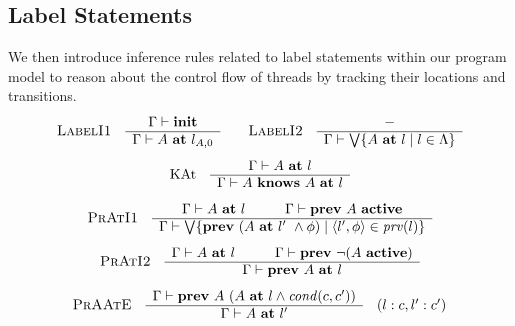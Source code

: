 \subsection{Label Statements}
We then introduce inference rules related to label statements within our program model to reason about the control flow of threads by tracking their locations and transitions. 
%
\[
\begin{array}{ccc}
\begin{array}{cc}
\mbox{\sc LabelI1}
&
\begin{array}{c}
\Gamma \vdash \mathbf{init} \\ \hline
\Gamma \vdash A\ \mathbf{at}\ l_{A,0}
\end{array}
\end{array}
&
\begin{array}{cc}
\mbox{\sc LabelI2}
&
\begin{array}{c}
- \\ \hline
\Gamma \vdash \bigvee\{A\ \mathbf{at}\ l\mid l\in\Lambda\}
\end{array}
\end{array}
\end{array}
\]
%
\[
\begin{array}{cc}
\mbox{KAt}
&
\begin{array}{c}
\Gamma \vdash A\ \mathbf{at}\ l \\ \hline
\Gamma \vdash A\ \mathbf{knows}\ A\ \mathbf{at}\ l
\end{array}
\end{array}
\]
\[
\begin{array}{cc}
\mbox{\sc PrAtI1} 
&
\begin{array}{c}
\Gamma \vdash A\ \mathbf{at}\ l \hspace*{1cm}
\Gamma \vdash \mathbf{prev}\ A\ \mathbf{active} \\ \hline
\Gamma \vdash \bigvee\{\mathbf{prev}\ (A\ \mathbf{at} \ l'\ \wedge \phi) \mid \langle l',\phi\rangle \in \mathit{prv}(l)\}
\end{array}
\end{array}
\]
\[
\begin{array}{cc}
\mbox{\sc PrAtI2} 
&
\begin{array}{c}
\Gamma \vdash A\ \mathbf{at}\ l \hspace*{1cm}
\Gamma \vdash \mathbf{prev}\ \neg (A\ \mathbf{active}) \\ \hline
\Gamma \vdash \mathbf{prev}\ A\ \mathbf{at}\ l
\end{array}
\end{array}
\]
% 
\[
\begin{array}{ccc}
\mbox{\sc PrAAtE} 
&
\begin{array}{c}
\Gamma \vdash \mathbf{prev}\ A\ (A\ \mathbf{at}\ l \wedge \mathit{cond}(c,c')) \\ \hline
\Gamma \vdash A\ \mathbf{at} \ l'
\end{array}
&
(l:c, l':c')
\end{array}
\]
%
